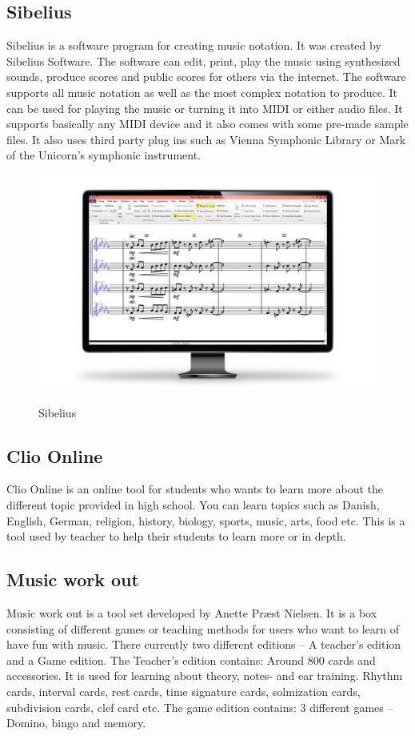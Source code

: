 \subsection{Sibelius}
Sibelius is a software program for creating music notation. It was created by Sibelius Software. The software can edit, print, play the music using synthesized sounds, produce scores and public scores for others via the internet. The software supports all music notation as well as the most complex notation to produce. It can be used for playing the music or turning it into MIDI or either audio files. It supports basically any MIDI device and it also comes with some pre-made sample files. It also uses third party plug ins such as Vienna Symphonic Library or Mark of the Unicorn’s symphonic instrument. 

\begin{figure}[H]
	\centering
	\includegraphics[width=0.7\linewidth]{figure/Analysis/Sibelius}
	\label{fig:sibelius}
	\caption{Sibelius}
\end{figure}

\subsection{Clio Online}
Clio Online is an online tool for students who wants to learn more about the different topic provided in high school. You can learn topics such as Danish, English, German, religion, history, biology, sports, music, arts, food etc. This is a tool used by teacher to help their students to learn more or in depth. 

\subsection{Music work out}
Music work out is a tool set developed by Anette Præst Nielsen. It is a box consisting of different games or teaching methods for users who want to learn of have fun with music. There currently two different editions – A teacher’s edition and a Game edition.  The Teacher’s edition contains: Around 800 cards and accessories. It is used for learning about theory, notes- and ear training. Rhythm cards, interval cards, rest cards, time signature cards, solmization cards, subdivision cards, clef card etc. The game edition contains: 3 different games – Domino, bingo and memory. 

